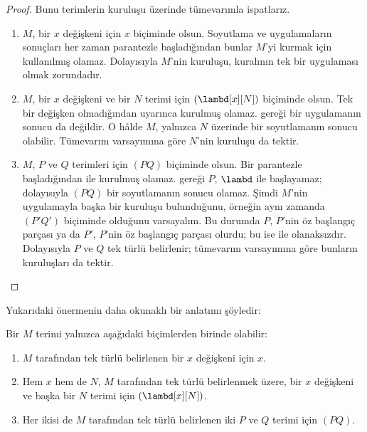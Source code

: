 \documentclass[../../../include/open-logic-section]{subfiles}
\begin{document}
\begin{proof}
  Bunu terimlerin kuruluşu üzerinde tümevarımla ispatlarız.
  \begin{enumerate}
    \item $M$, bir $x$ değişkeni için $x$ biçiminde olsun. Soyutlama ve
      uygulamaların sonuçları her zaman parantezle başladığından bunlar
      $M$'yi kurmak için kullanılmış olamaz. Dolayısıyla $M$'nin kuruluşu,
       kuralının tek bir
      uygulaması olmak zorundadır.
    \item $M$, bir $x$ değişkeni ve bir $N$ terimi için
      $(\lambd[x][N])$ biçiminde olsun. Tek bir değişken olmadığından
       uyarınca kurulmuş
      olamaz.  gereği bir uygulamanın sonucu da değildir.
      O hâlde $M$, yalnızca $N$ üzerinde bir soyutlamanın sonucu olabilir.
      Tümevarım varsayımına göre $N$'nin kuruluşu da tektir.
    \item $M$, $P$ ve $Q$ terimleri için $(PQ)$ biçiminde olsun. Bir
      parantezle başladığından
       ile kurulmuş olamaz.
       gereği $P$, $\lambd$ ile başlayamaz; dolayısıyla
      $(PQ)$ bir soyutlamanın sonucu olamaz. Şimdi $M$'nin uygulamayla başka
      bir kuruluşu bulunduğunu, örneğin aynı zamanda $(P'Q')$ biçiminde
      olduğunu varsayalım. Bu durumda $P$, $P'$nin öz başlangıç parçası ya da
      $P'$, $P$'nin öz başlangıç parçası olurdu; bu ise
       ile olanaksızdır. Dolayısıyla $P$ ve $Q$ tek türlü
      belirlenir; tümevarım varsayımına göre bunların kuruluşları da tektir.
  \end{enumerate}
\end{proof}

Yukarıdaki önermenin daha okunaklı bir anlatımı şöyledir:
\begin{prop}
  Bir $M$ terimi yalnızca aşağıdaki biçimlerden birinde olabilir:
  \begin{enumerate}
    \item $M$ tarafından tek türlü belirlenen bir $x$ değişkeni için $x$.
    \item Hem $x$ hem de $N$, $M$ tarafından tek türlü belirlenmek üzere,
      bir $x$ değişkeni ve başka bir $N$ terimi için $(\lambd[x][N])$.
    \item Her ikisi de $M$ tarafından tek türlü belirlenen iki $P$ ve $Q$
      terimi için $(PQ)$.
  \end{enumerate}
\end{prop}
\end{document}
